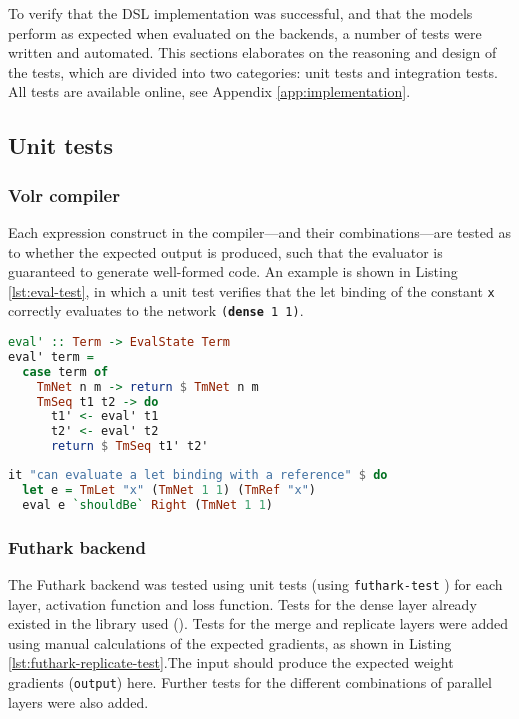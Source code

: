 To verify that the DSL implementation was successful, and that the models perform as expected when evaluated on the
backends, a number of tests were written and automated.
This sections elaborates on the reasoning and design of the tests, which are divided into two categories: unit
tests and integration tests.
\\[0.2cm]
All tests are available online, see Appendix \ref{app:implementation}.

\subsection{Unit tests}
\subsubsection{Volr compiler}
Each expression construct in the compiler---and their combinations---are
tested as to whether the expected output is produced, such that the evaluator
is guaranteed to generate well-formed code.
An example is shown in Listing \ref{lst:eval-test},
in which a unit test  verifies that the let
binding of the constant \texttt{x} correctly
evaluates to the network \texttt{(\textbf{dense} 1 1)}.

\begin{minipage}{\linewidth}
\begin{lstlisting}[language=haskell,caption={Part of the evaluation code in
Haskell.},label={code:evaluator}]
eval' :: Term -> EvalState Term
eval' term =
  case term of
    TmNet n m -> return $ TmNet n m
    TmSeq t1 t2 -> do
      t1' <- eval' t1 
      t2' <- eval' t2
      return $ TmSeq t1' t2'
\end{lstlisting}
\end{minipage}

\begin{lstlisting}[language=Haskell,label={lst:eval-test},caption={A unit test for the correct evaluation of a let binding.}]
it "can evaluate a let binding with a reference" $ do
  let e = TmLet "x" (TmNet 1 1) (TmRef "x")
  eval e `shouldBe` Right (TmNet 1 1)
\end{lstlisting} 

\subsubsection{Futhark backend}
The Futhark backend was tested using unit tests (using \texttt{futhark-test}
\cite{Elsman2018}) for each layer, activation function and loss function.
Tests for the dense layer already existed in the library used (\cite{Minh2018}). Tests for the merge and
replicate layers were added using manual calculations of the expected gradients, as shown in Listing
\ref{lst:futhark-replicate-test}.The input should produce the expected weight
gradients (\texttt{output}) here.
Further tests for the different combinations of parallel layers were also added.

